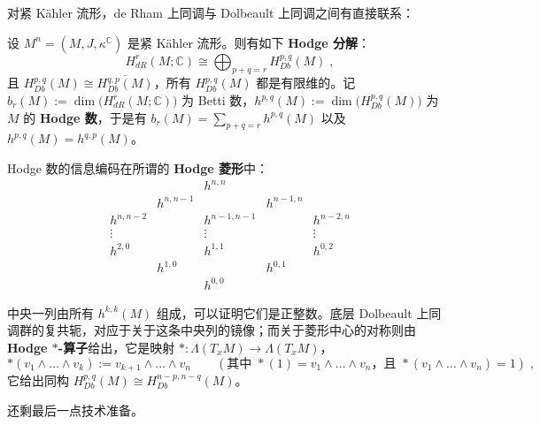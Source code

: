 对紧 Kähler 流形，de Rham 上同调与 Dolbeault 上同调之间有直接联系：

\begin{Thm}[Hodge]\label{thm:7.4}
设 $M^n=(M,J,\kappa^{\mathbb C})$ 是紧 Kähler 流形。则有如下 \textbf{Hodge 分解}：
\[
H^r_{dR}(M;\mathbb C)\cong\bigoplus_{p+q=r}H^{p,q}_{Db}(M)\;,
\]
且 $H^{p,q}_{Db}(M)\cong\overline{H^{q,p}_{Db}(M)}$，所有 $H^{p,q}_{Db}(M)$ 都是有限维的。记 $b_r(M):=\dim\bigl(H^r_{dR}(M;\mathbb C)\bigr)$ 为 Betti 数，$h^{p,q}(M):=\dim\bigl(H^{p,q}_{Db}(M)\bigr)$ 为 $M$ 的 \textbf{Hodge 数}，于是有 $b_r(M)=\sum_{p+q=r}h^{p,q}(M)$ 以及 $h^{p,q}(M)=h^{q,p}(M)$。
\end{Thm}

Hodge 数的信息编码在所谓的 \textbf{Hodge 菱形}中：
\begin{equation}\label{eq:7.104}
\begin{array}{ccccccc}
& & & h^{n,n} & & & \\
& & h^{n,n-1} & & h^{n-1,n} & & \\
& h^{n,n-2} & & h^{n-1,n-1} & & h^{n-2,n} & \\
& \vdots & & \vdots & & \vdots & \\
& h^{2,0} & & h^{1,1} & & h^{0,2} & \\
& & h^{1,0} & & h^{0,1} & & \\
& & & h^{0,0} & & &
\end{array}
\end{equation}

中央一列由所有 $h^{k,k}(M)$ 组成，可以证明它们是正整数。底层 Dolbeault 上同调群的复共轭，对应于关于这条中央列的镜像；而关于菱形中心的对称则由 \textbf{Hodge $\ast$-算子}给出，它是映射 $\ast:\Lambda(T_xM)\to\Lambda(T_xM)$，
\[
\ast(v_1\wedge\dots\wedge v_k):=v_{k+1}\wedge\dots\wedge v_n
\qquad(\text{其中 }\ast(1)=v_1\wedge\dots\wedge v_n\text{，且 }\ast(v_1\wedge\dots\wedge v_n)=1)\;,
\]
它给出同构 $H^{p,q}_{Db}(M)\cong H^{n-p,n-q}_{Db}(M)$。

还剩最后一点技术准备。

